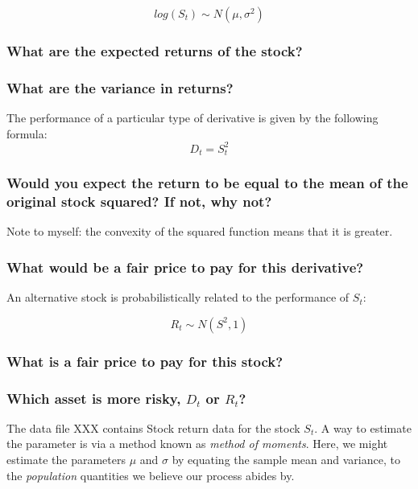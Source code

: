 \documentclass[11pt,fullpage]{book}
\begin{document}
\begin{equation}
log(S_t) \sim N(\mu,\sigma^2)
\end{equation}

\subsubsection{What are the expected returns of the stock?}
\subsubsection{What are the variance in returns?}

The performance of a particular type of derivative is given by the following formula:
\begin{equation}
D_t = S_t^2
\end{equation}

\subsubsection{Would you expect the return to be equal to the mean of the original stock squared? If not, why not?}
Note to myself: the convexity of the squared function means that it is greater.
\subsubsection{What would be a fair price to pay for this derivative?}

An alternative stock is probabilistically related to the performance of $S_t$:

\begin{equation}
R_t \sim N(S^2,1)
\end{equation}

\subsubsection{What is a fair price to pay for this stock?}
\subsubsection{Which asset is more risky, $D_t$ or $R_t$?}

The data file XXX contains Stock return data for the stock $S_t$. A way to estimate the parameter is via a method known as \textit{method of moments}. Here, we might estimate the parameters $\mu$ and $\sigma$ by equating the sample mean and variance, to the \textit{population} quantities we believe our process abides by.
\end{document}
